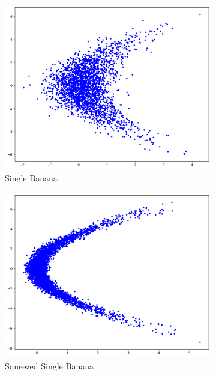 \begin{figure}[ht]
\centering
\begin{subfigure}[b]{0.32\textwidth}
\includegraphics[width=\textwidth]{Chapter5/results/visualisations/datasets/single_banana.png}
\caption{Single Banana}
\end{subfigure}
\begin{subfigure}[b]{0.32\textwidth}
\includegraphics[width=\textwidth]{Chapter5/results/visualisations/datasets/squeezed_single_banana.png}
\caption{Squeezed Single Banana}
\end{subfigure}
\begin{subfigure}[b]{0.32\textwidth}

\end{subfigure}
\end{figure}
